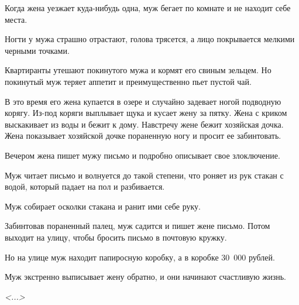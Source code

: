 Когда жена уезжает куда-нибудь одна, муж бегает по комнате и не находит себе места.

Ногти у мужа страшно отрастают, голова трясется, а лицо покрывается мелкими черными точками.

Квартиранты утешают покинутого мужа и кормят его свиным зельцем. Но покинутый муж теряет аппетит и преимущественно пьет пустой чай.

В это время его жена купается в озере и случайно задевает ногой подводную корягу. Из-под коряги выплывает щука и кусает жену за пятку. Жена с криком выскакивает из воды и бежит к дому. Навстречу жене бежит хозяйская дочка. Жена показывает хозяйской дочке пораненную ногу и просит ее забинтовать.

Вечером жена пишет мужу письмо и подробно описывает свое злоключение.

Муж читает письмо и волнуется до такой степени, что роняет из рук стакан с водой, который падает на пол и разбивается.

Муж собирает осколки стакана и ранит ими себе руку.

Забинтовав пораненный палец, муж садится и пишет жене письмо. Потом выходит на улицу, чтобы бросить письмо в почтовую кружку.

Но на улице муж находит папиросную коробку, а в коробке 30~000 рублей.

Муж экстренно выписывает жену обратно, и они начинают счастливую жизнь.

\vspace{1em}
\hfill \emph{<...>}